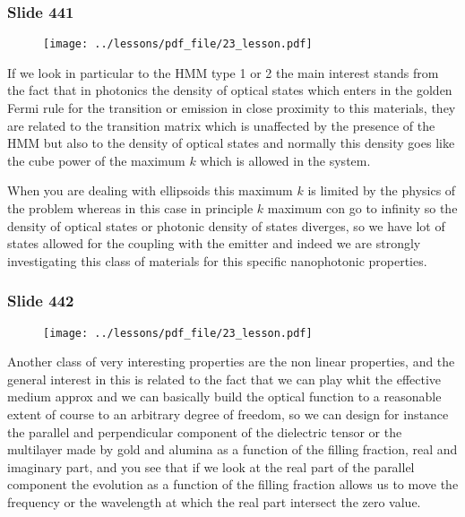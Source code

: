 \documentclass[../main/main.tex]{subfiles}
\begin{document}
\newpage

\subsubsection{Slide 441}

\begin{figure}[h!]
\centering
\texttt{[image: ../lessons/pdf\_file/23\_lesson.pdf]}
\end{figure}

If we look in particular to the HMM type 1 or 2 the main interest stands from the fact that in photonics the density of optical states which enters in the golden Fermi rule for the transition or emission in close proximity to this materials, they are related to the transition matrix which is unaffected by the presence of the HMM but also to the density of optical states and normally this density goes like the cube power of the maximum $k$ which is allowed in the system.

When you are dealing with ellipsoids this maximum $k$ is limited by the physics of the problem whereas in this case in principle $k$ maximum con go to infinity so the density of optical states or photonic density of states diverges, so we have lot of states allowed for the coupling with the emitter and indeed we are strongly investigating this class of materials for this specific nanophotonic properties.

\newpage

\subsubsection{Slide 442}

\begin{figure}[h!]
\centering
\texttt{[image: ../lessons/pdf\_file/23\_lesson.pdf]}
\end{figure}

Another class of very interesting properties are the non linear properties, and the general interest in this is related to the fact that we can play whit the effective medium approx and we can basically build the optical function to a reasonable extent of course to an arbitrary degree of freedom, so we can design for instance the parallel and perpendicular component of the dielectric tensor or the multilayer made by gold and alumina as a function of the filling fraction, real and imaginary part, and you see that if we look at the real part of the parallel component the evolution as a function of the filling fraction allows us to move the frequency or the wavelength at which the real part intersect the zero value.
\end{document}
